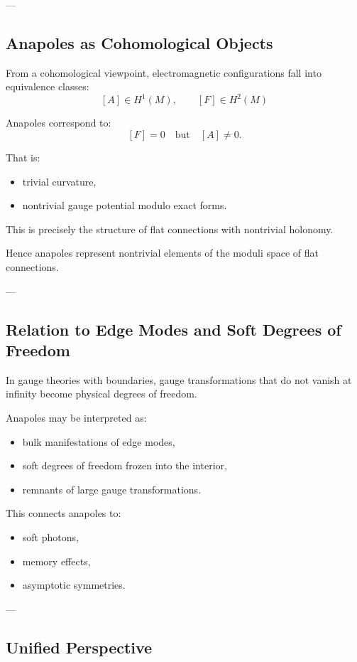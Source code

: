 \documentclass[11pt]{article}
\begin{document}
---

\subsection{Anapoles as Cohomological Objects}

From a cohomological viewpoint, electromagnetic configurations fall into equivalence classes:
\[
[A] \in H^1(M), \qquad [F] \in H^2(M)
\]

Anapoles correspond to:
\[
[F] = 0 \quad \text{but} \quad [A] \neq 0.
\]

That is:
\begin{itemize}
\item trivial curvature,
\item nontrivial gauge potential modulo exact forms.
\end{itemize}

This is precisely the structure of flat connections with nontrivial holonomy.

Hence anapoles represent nontrivial elements of the moduli space of flat connections.

---

\subsection{Relation to Edge Modes and Soft Degrees of Freedom}

In gauge theories with boundaries, gauge transformations that do not vanish at infinity become physical degrees of freedom.

Anapoles may be interpreted as:
\begin{itemize}
\item bulk manifestations of edge modes,
\item soft degrees of freedom frozen into the interior,
\item remnants of large gauge transformations.
\end{itemize}

This connects anapoles to:
\begin{itemize}
\item soft photons,
\item memory effects,
\item asymptotic symmetries.
\end{itemize}

---

\subsection{Unified Perspective}
\end{document}
